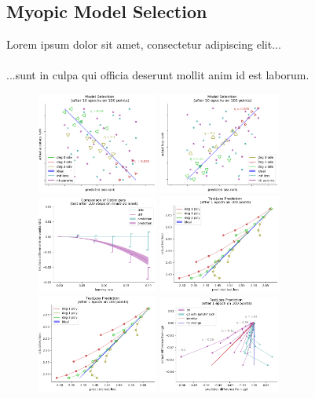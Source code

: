 \documentclass{article}
\newcommand{\lorem}[1]{
    Lorem ipsum dolor sit amet, consectetur adipiscing elit...\\
    \nopagebreak\vspace{#1cm} \ \\
    ...sunt in culpa qui officia deserunt mollit anim id est laborum.
}
\begin{document}
\subsection*{Myopic Model Selection}
    \lorem{3}
    \begin{figure}[h!]
        \centering
        \includegraphics[width=4.0cm, trim={0 0 0 1.0cm}, clip]{model-selection-acc}
        \includegraphics[width=4.0cm, trim={0 0 0 1.0cm}, clip]{model-selection-loss} \\
        \includegraphics[width=4.0cm, trim={0 0 0 1.0cm}, clip]{batchmatch-06} 
        \includegraphics[width=4.0cm, trim={0 0 0 1.0cm}, clip]{test-loss} \\
        \includegraphics[width=4.0cm, trim={0 0 0 1.0cm}, clip]{test-loss} 
        \includegraphics[width=4.0cm, trim={0 0 0 1.0cm}, clip]{test-loss-bm}

\end{figure}
\end{document}
